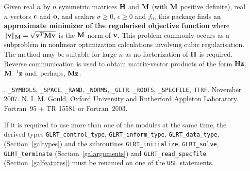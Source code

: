 \documentclass{galahad}
\newcommand{\packagename}{GL\-RT}
\newcommand{\fullpackagename}{\libraryname\_\packagename}
\begin{document}
\galheader


\galsummary
Given real $n$ by $n$ symmetric matrices ${\mathbf{H}}$ and ${\mathbf{M}}$
(with ${\mathbf{M}}$ positive definite), real
$n$ vectors ${\mathbf{c}}$ and ${\mathbf{o}}$, and scalars $\sigma\geq 0$, $\epsilon\geq 0$
and $f_0$, this package finds an
{\bf approximate minimizer of the regularised objective function}
where $\|  {\mathbf{v}} \|_{{\mathbf{M}}} = \sqrt{{\mathbf{v}}^T {\mathbf{M}} {\mathbf{v}}}$ is
the ${\mathbf{M}}$-norm of ${\mathbf{v}}$.
This problem commonly occurs as a subproblem in nonlinear
optimization calculations involving cubic regularisation.
The method may be suitable for large $n$ as no factorization of ${\mathbf{H}}$ is
required. Reverse communication is used to obtain
matrix-vector products of the form ${\mathbf{H}} {\mathbf{z}}$, ${\mathbf{M}}^{-1} {\mathbf{z}}$
and, perhaps, ${\mathbf{M}} {\mathbf{z}}$.



\galattributes
\galversions{\tt  \fullpackagename\_single, \fullpackagename\_double}.
\galuses
{\tt \libraryname\_SY\-M\-BOLS},
{\tt \libraryname\_SPACE}, {\tt \libraryname\_\-RAND},
{\tt \libraryname\_\-NORMS}, {\tt \libraryname\_\-GLTR},
{\tt \libraryname\_ROOTS}, {\tt \libraryname\_SPECFILE},
{\tt *TTRF}.
\galdate November 2007.
\galorigin N. I. M. Gould, Oxford University and Rutherford Appleton Laboratory.
\gallanguage Fortran~95 + TR 15581 or Fortran~2003.


\galhowto



\noindent
If it is required to use more than one of the modules at the same time, 
the derived types
{\tt \packagename\_control\_type}, {\tt \packagename\_inform\_type},
{\tt \packagename\_data\_type},
(Section~\ref{galtypes})
and the subroutines
{\tt \packagename\_initialize},
{\tt \packagename\_solve}, {\tt \packagename\_terminate}
(Section~\ref{galarguments})
and
{\tt \packagename\_read\_specfile}
(Section~\ref{galfeatures})
must be renamed on one of the {\tt USE} statements.




\end{document}
